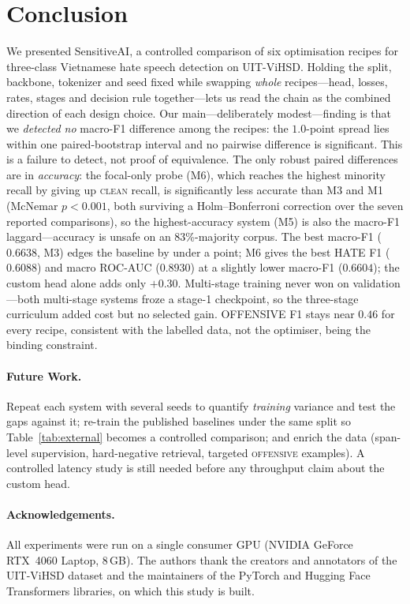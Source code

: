 \section{Conclusion}
\label{sec:conclusion}

We presented SensitiveAI, a controlled comparison of six optimisation recipes for
three-class Vietnamese hate speech detection on UIT-ViHSD.  Holding the split,
backbone, tokenizer and seed fixed while swapping \emph{whole}
recipes---head, losses, rates, stages and decision rule together---lets us read the
chain as the combined direction of each design choice.  Our main---deliberately
modest---finding is that we
\emph{detected no} macro-F1 difference among the recipes: the $1.0$-point spread
lies within one paired-bootstrap interval and no pairwise difference is
significant.  This is a failure to detect, not proof of equivalence.  The
only robust paired differences are in \emph{accuracy}: the focal-only probe (M6),
which reaches the highest minority recall by giving up \textsc{clean} recall, is
significantly less accurate than M3 and M1 (McNemar $p<0.001$, both surviving a
Holm--Bonferroni correction over the seven reported comparisons), so the
highest-accuracy system (M5) is also the
macro-F1 laggard---accuracy is unsafe on an 83\%-majority corpus.  The best macro-F1
($0.6638$, M3) edges the baseline by under a point; M6 gives the best HATE F1
($0.6088$) and macro ROC-AUC ($0.8930$) at a slightly lower macro-F1 ($0.6604$);
the custom head alone adds only $+0.30$.  Multi-stage training never won on
validation---both multi-stage systems froze a stage-1 checkpoint, so the
three-stage curriculum added cost but no selected gain.  OFFENSIVE F1 stays near
$0.46$ for every recipe, consistent with the labelled data, not the optimiser,
being the binding constraint.

\paragraph{Future Work.}
Repeat each system with several seeds to quantify \emph{training} variance and test
the gaps against it; re-train the published baselines under the same split so
Table~\ref{tab:external} becomes a controlled comparison; and enrich the data
(span-level supervision, hard-negative retrieval, targeted
\textsc{offensive} examples).  A controlled latency study is still needed before
any throughput claim about the custom head.

\paragraph*{Acknowledgements.}
All experiments were run on a single consumer GPU (NVIDIA GeForce RTX~4060
Laptop, 8\,GB).  The authors thank the creators and annotators of the UIT-ViHSD
dataset and the maintainers of the PyTorch and Hugging Face Transformers
libraries, on which this study is built.

